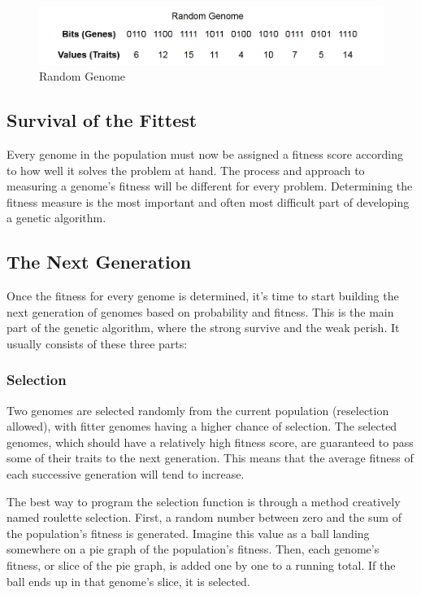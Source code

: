 \documentclass[12pt]{report}
\begin{document}
\begin{figure}[h!]
	\centering
		\includegraphics[scale=0.8]{genome.png}
	\caption{Random Genome}
	\label{fig:ID3}
\end{figure}


\subsection{Survival of the Fittest}
Every genome in the population must now be assigned a fitness score according to how well it solves the problem at hand. The process and approach to measuring a genome’s fitness will be different for every problem. Determining the fitness measure is the most important and often most difficult part of developing a genetic algorithm. 

\subsection{The Next Generation}

Once the fitness for every genome is determined, it’s time to start building the next generation of genomes based on probability and fitness. This is the main part of the genetic algorithm, where the strong survive and the weak perish. It usually consists of these three parts: 

\subsubsection{Selection}
Two genomes are selected randomly from the current population (reselection allowed), with fitter genomes having a higher chance of selection. The selected genomes, which should have a relatively high fitness score, are guaranteed to pass some of their traits to the next generation. This means that the average fitness of each successive generation will tend to increase.

The best way to program the selection function is through a method creatively named roulette selection. First, a random number between zero and the sum of the population’s fitness is generated. Imagine this value as a ball landing somewhere on a pie graph of the population’s fitness. Then, each genome’s fitness, or slice of the pie graph, is added one by one to a running total. If the ball ends up in that genome’s slice, it is selected. 
\end{document}
